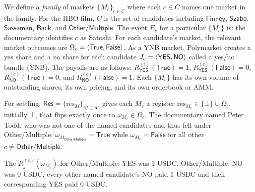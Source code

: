 We define a \textit{family} of markets $\{M_c\}_{c\in C}$ where each $c\in C$ names one market in the family. For the HBO film, $C$ is the set of candidates including $\mathsf{Finney}$, $\mathsf{Szabo}$,  $\mathsf{Sassaman}$,  $\mathsf{Back}$, and $\mathsf{Other/Multiple}$. The event $E_c$ for a particular $\{M_c\}$ is: the documentary identifies $c$ as Satoshi. For each candidate's market, the relevant market outcomes are $\Omega_c=\left \langle \mathsf{True},\mathsf{False} \right \rangle$. As a YNB market, Polymarket creates a yes share and a no share for each candidate $J_c=\left \langle \textsf{YES},\textsf{NO} \right \rangle$ called a yes/no bundle (YNB). The payoffs are as follows: $R^{(c)}_{\textsf{YES}}(\mathsf{True})=1$, $R^{(c)}_{\textsf{YES}}(\mathsf{False})=0$, $R^{(c)}_{\textsf{NO}}(\mathsf{True})=0$, and $R^{(c)}_{\textsf{NO}}(\mathsf{False})=1$. Each $\{M_c\}$ has its own volume of outstanding shares, its own pricing, and its own orderbook or AMM. 

For settling, $\mathsf{Res}=\{\mathrm{res}_{M}\}_{M\in\mathcal{M}}$ gives each $M_c$ a register $\mathrm{res}_{M_c}\in\{\bot\}\cup\Omega_c$, initially $\bot$, that flips exactly once to $\omega_{M_c}\in\Omega_c$. The documentary named Peter Todd, who was not one of the named candidates and thus fell under \textsf{Other/Multiple}: $\omega_{M_{\textsf{Other/Multiple}}}=\mathsf{True}$ while $\omega_{M_c}=\mathsf{False}$ for all other $c\neq\textsf{Other/Multiple}$. 

The $R^{(c)}_j(\omega_{M_c})$ for \textsf{Other/Multiple: YES} was $1$ USDC, \textsf{Other/Multiple: NO} was $0$ USDC, every other named candidate’s \textsf{NO} paid $1$ USDC and their corresponding \textsf{YES} paid $0$ USDC. 

%
%
%



